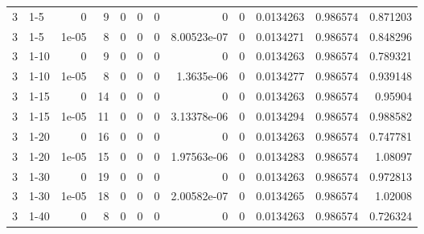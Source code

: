 \begin{tabular}{rlrrrrrrrrrr}
     3 & 1-5    &      0     &           9 &                 0 &                 0 &     0           &     0           &      0           &        0.0134263 &               0.986574 &           0.871203 \\
     3 & 1-5    &      1e-05 &           8 &                 0 &                 0 &     0           &     8.00523e-07 &      0           &        0.0134271 &               0.986574 &           0.848296 \\
     3 & 1-10   &      0     &           9 &                 0 &                 0 &     0           &     0           &      0           &        0.0134263 &               0.986574 &           0.789321 \\
     3 & 1-10   &      1e-05 &           8 &                 0 &                 0 &     0           &     1.3635e-06  &      0           &        0.0134277 &               0.986574 &           0.939148 \\
     3 & 1-15   &      0     &          14 &                 0 &                 0 &     0           &     0           &      0           &        0.0134263 &               0.986574 &           0.95904  \\
     3 & 1-15   &      1e-05 &          11 &                 0 &                 0 &     0           &     3.13378e-06 &      0           &        0.0134294 &               0.986574 &           0.988582 \\
     3 & 1-20   &      0     &          16 &                 0 &                 0 &     0           &     0           &      0           &        0.0134263 &               0.986574 &           0.747781 \\
     3 & 1-20   &      1e-05 &          15 &                 0 &                 0 &     0           &     1.97563e-06 &      0           &        0.0134283 &               0.986574 &           1.08097  \\
     3 & 1-30   &      0     &          19 &                 0 &                 0 &     0           &     0           &      0           &        0.0134263 &               0.986574 &           0.972813 \\
     3 & 1-30   &      1e-05 &          18 &                 0 &                 0 &     0           &     2.00582e-07 &      0           &        0.0134265 &               0.986574 &           1.02008  \\
     3 & 1-40   &      0     &           8 &                 0 &                 0 &     0           &     0           &      0           &        0.0134263 &               0.986574 &           0.726324 \\

\end{tabular}
